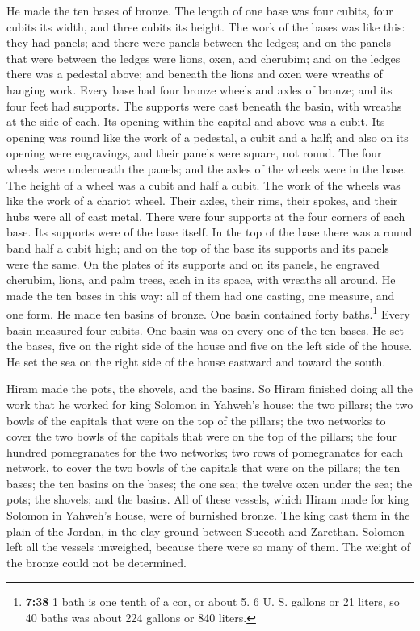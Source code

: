  He made the ten bases of bronze. The length of one base
was four cubits, four cubits its width, and three cubits its height.
 The work of the bases was like this: they had panels;
and there were panels between the ledges;  and on the
panels that were between the ledges were lions, oxen, and cherubim; and
on the ledges there was a pedestal above; and beneath the lions and oxen
were wreaths of hanging work.  Every base had four bronze
wheels and axles of bronze; and its four feet had supports. The supports
were cast beneath the basin, with wreaths at the side of each.
 Its opening within the capital and above was a cubit.
Its opening was round like the work of a pedestal, a cubit and a half;
and also on its opening were engravings, and their panels were square,
not round.  The four wheels were underneath the panels;
and the axles of the wheels were in the base. The height of a wheel was
a cubit and half a cubit.  The work of the wheels was
like the work of a chariot wheel. Their axles, their rims, their spokes,
and their hubs were all of cast metal.  There were four
supports at the four corners of each base. Its supports were of the base
itself.  In the top of the base there was a round band
half a cubit high; and on the top of the base its supports and its
panels were the same.  On the plates of its supports and
on its panels, he engraved cherubim, lions, and palm trees, each in its
space, with wreaths all around.  He made the ten bases in
this way: all of them had one casting, one measure, and one form.
 He made ten basins of bronze. One basin contained forty
baths.\footnote{\textbf{7:38} 1 bath is one tenth of a cor, or about 5.
  6 U. S. gallons or 21 liters, so 40 baths was about 224 gallons or 840
  liters.} Every basin measured four cubits. One basin was on every one
of the ten bases.  He set the bases, five on the right
side of the house and five on the left side of the house. He set the sea
on the right side of the house eastward and toward the south.

 Hiram made the pots, the shovels, and the basins. So
Hiram finished doing all the work that he worked for king Solomon in
Yahweh's house:  the two pillars; the two bowls of the
capitals that were on the top of the pillars; the two networks to cover
the two bowls of the capitals that were on the top of the pillars;
 the four hundred pomegranates for the two networks; two
rows of pomegranates for each network, to cover the two bowls of the
capitals that were on the pillars;  the ten bases; the
ten basins on the bases;  the one sea; the twelve oxen
under the sea;  the pots; the shovels; and the basins.
All of these vessels, which Hiram made for king Solomon in Yahweh's
house, were of burnished bronze.  The king cast them in
the plain of the Jordan, in the clay ground between Succoth and
Zarethan.  Solomon left all the vessels unweighed,
because there were so many of them. The weight of the bronze could not
be determined.

